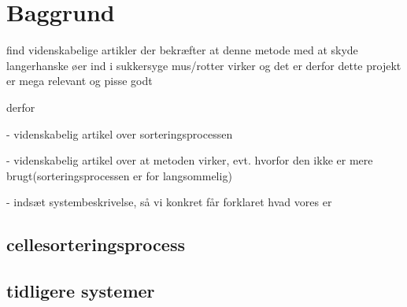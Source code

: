  \section{Baggrund}
 find videnskabelige artikler der bekræfter at denne metode med at skyde langerhanske øer ind i sukkersyge mus/rotter virker og det er derfor dette projekt er mega relevant og pisse godt
 
 derfor
 
 - videnskabelig artikel over sorteringsprocessen
 
 - videnskabelig artikel over at metoden virker, evt. hvorfor den ikke er mere brugt(sorteringsprocessen er for langsommelig)
 
 
 
 
 
 
 - indsæt systembeskrivelse, så vi konkret får forklaret hvad vores er
 
 \subsection{cellesorteringsprocess}
 \subsection{tidligere systemer}
